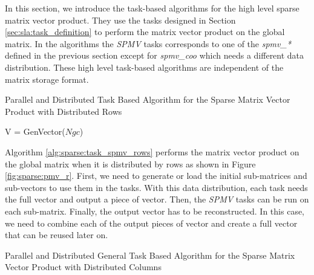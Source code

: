 In this section, we introduce the task-based algorithms for the high level sparse matrix vector product.
They use the tasks designed in Section \ref{sec:sla:task_definition} to perform the matrix vector product on the global matrix.
In the algorithms the \textit{SPMV} tasks corresponds to one of the \textit{spmv\_*} defined in the previous section except for \textit{spmv\_coo} which needs a different data distribution.
These high level task-based algorithms are independent of the matrix storage format.


\begin{algorithm}[h]
	\DontPrintSemicolon
	\caption{Parallel and Distributed Task Based Algorithm for the Sparse  Matrix Vector Product with Distributed Rows \label{alg:sparse:task_spmv_rows}}
	V = GenVector($Ngc$)\;
	\;
	\;

\end{algorithm}

Algorithm \ref{alg:sparse:task_spmv_rows} performs the matrix vector product on the global matrix when it is distributed by rows as shown in Figure \ref{fig:sparse:pmv_r}.
First, we need to generate or load the initial sub-matrices and sub-vectors to use them in the tasks.
With this data distribution, each task needs the full vector and output a piece of vector.
Then, the \textit{SPMV} tasks can be run on each sub-matrix.
Finally, the output vector has to be reconstructed.
In this case, we need to combine each of the output pieces of vector and create a full vector that can be reused later on.


\begin{algorithm}[h]
	\DontPrintSemicolon
	\caption{Parallel and Distributed General Task Based Algorithm for the Sparse  Matrix Vector Product with Distributed Columns \label{alg:sparse:task_spmv_col}}
	\;
	\;
\end{algorithm}

